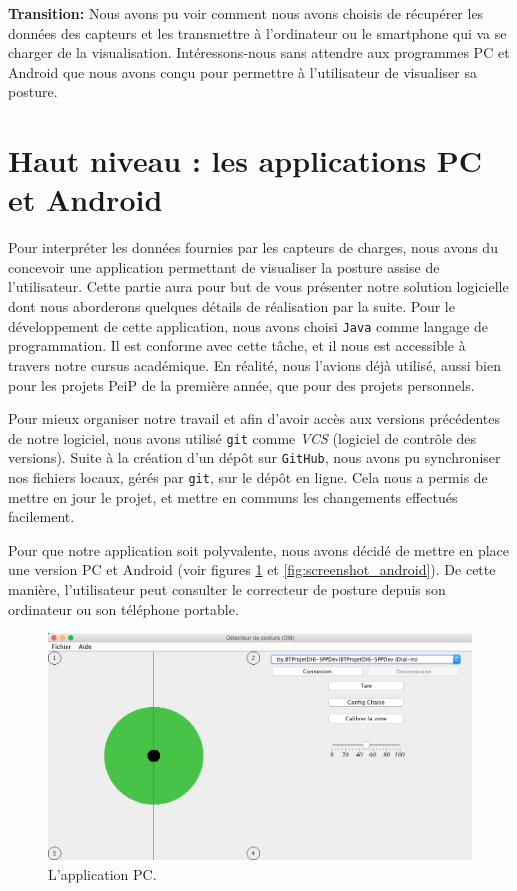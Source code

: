 \documentclass{polytech/polytech}
\begin{document}
\textbf{Transition:} Nous avons pu voir comment nous avons choisis de récupérer les données des capteurs et les transmettre à l'ordinateur ou le smartphone qui va se charger de la visualisation. Intéressons-nous sans attendre aux programmes PC et Android que nous avons conçu pour permettre à l'utilisateur de visualiser sa posture.

\section{Haut niveau : les applications PC et Android}
\label{sec:logiciel_haut}

Pour interpréter les données fournies par les capteurs de charges, nous avons du concevoir une application permettant de visualiser la posture assise de l'utilisateur.
 Cette partie aura pour but de vous présenter notre solution logicielle dont nous aborderons quelques détails de réalisation par la suite.
Pour le développement de cette application, nous avons choisi \texttt{Java} comme langage de programmation. Il est conforme avec cette tâche, et il nous est accessible à travers notre cursus académique. En réalité, nous l'avions déjà utilisé, aussi bien pour les projets PeiP de la première année, que pour des projets personnels.

Pour mieux organiser notre travail et afin d'avoir accès aux versions précédentes de notre logiciel, nous avons utilisé \texttt{git} comme \textit{VCS} (logiciel de contrôle des versions). Suite à la création d'un dépôt sur \texttt{GitHub}, nous avons pu synchroniser nos fichiers locaux, gérés par \texttt{git}, sur le dépôt en ligne. Cela nous a permis de mettre en jour le projet, et mettre en communs les changements effectués facilement.

Pour que notre application soit polyvalente, nous avons décidé de mettre en place une version PC et Android (voir figures \ref{fig:screenshot_pc} et \ref{fig:screenshot_android}). De cette manière, l'utilisateur peut consulter le correcteur de posture depuis son ordinateur ou son téléphone portable.

\begin{figure}[htbp]
\begin{center}
\includegraphics[width=12cm]{image/screenshot_pc1}
\end{center}
\caption{L'application PC.}
\label{fig:screenshot_pc}
\end{figure}
\end{document}
